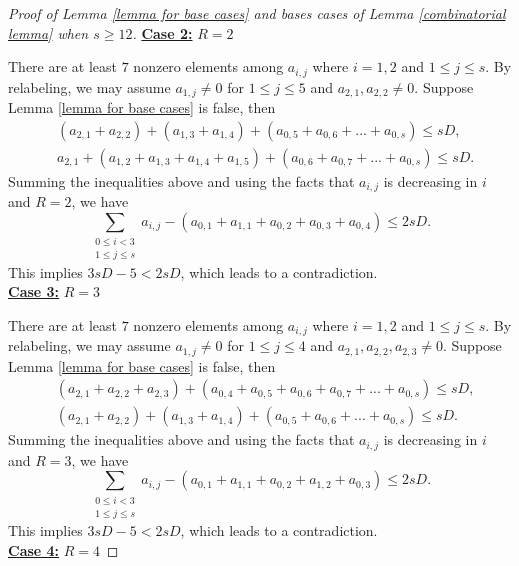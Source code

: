 \documentclass[11pt]{amsart}
\theoremstyle{plain} %
\theoremstyle{remark}
\numberwithin{equation}{section}
\begin{document}
\begin{proof}[Proof of Lemma \ref{lemma for base cases} and bases cases of Lemma \ref{combinatorial lemma} when $s\geq 12$]
    \noindent\underline{\textbf{Case 2:}} $R=2$

    There are at least $7$ nonzero elements among $a_{i,j}$ where $i=1,2$ and $1\leq j\leq s$. By relabeling, we may assume $a_{1,j}\neq 0$ for $1\leq j\leq 5$ and $a_{2,1},a_{2,2}\neq 0$. Suppose Lemma \ref{lemma for base cases} is false, then
    \begin{align*}
        &(a_{2,1}+a_{2,2})+(a_{1,3}+a_{1,4})+(a_{0,5}+a_{0,6}+...+a_{0,s})\leq sD,\\
        &a_{2,1}+(a_{1,2}+a_{1,3}+a_{1,4}+a_{1,5})+(a_{0,6}+a_{0,7}+...+a_{0,s})\leq sD.
    \end{align*}
    Summing the inequalities above and using the facts that $a_{i,j}$ is decreasing in $i$ and $R=2$, we have
    \begin{equation*}
        \sum_{\substack{0\leq i<3\\1\leq j\leq s}}a_{i,j}-(a_{0,1}+a_{1,1}+a_{0,2}+a_{0,3}+a_{0,4})\leq 2sD.
    \end{equation*}
    This implies $3sD-5<2sD$, which leads to a contradiction.\\

    \noindent\underline{\textbf{Case 3:}} $R=3$

    There are at least $7$ nonzero elements among $a_{i,j}$ where $i=1,2$ and $1\leq j\leq s$. By relabeling, we may assume $a_{1,j}\neq 0$ for $1\leq j\leq 4$ and $a_{2,1},a_{2,2},a_{2,3}\neq 0$. Suppose Lemma \ref{lemma for base cases} is false, then
    \begin{align*}
        &(a_{2,1}+a_{2,2}+a_{2,3})+(a_{0,4}+a_{0,5}+a_{0,6}+a_{0,7}+...+a_{0,s})\leq sD,\\
        &(a_{2,1}+a_{2,2})+(a_{1,3}+a_{1,4})+(a_{0,5}+a_{0,6}+...+a_{0,s})\leq sD.
    \end{align*}
    Summing the inequalities above and using the facts that $a_{i,j}$ is decreasing in $i$ and $R=3$, we have
    \begin{equation*}
        \sum_{\substack{0\leq i<3\\1\leq j\leq s}}a_{i,j}-(a_{0,1}+a_{1,1}+a_{0,2}+a_{1,2}+a_{0,3})\leq 2sD.
    \end{equation*}
    This implies $3sD-5<2sD$, which leads to a contradiction.\\

    \noindent\underline{\textbf{Case 4:}} $R=4$


\end{proof}
\end{document}
